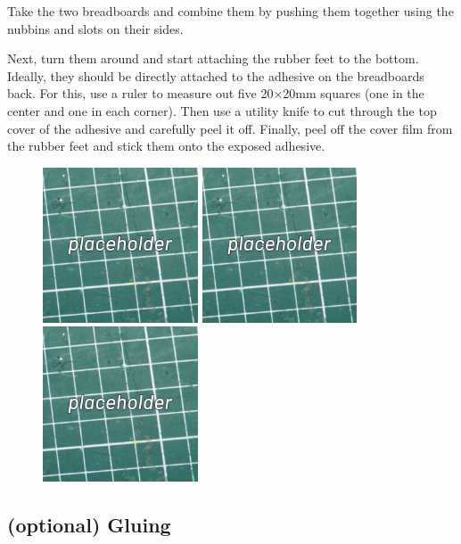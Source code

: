 \documentclass[12pt, a4paper]{article}
\begin{document}
Take the two breadboards and combine them by pushing them together using the nubbins and slots
on their sides.

Next, turn them around and start attaching the rubber feet to the bottom. Ideally, they should
be directly attached to the adhesive on the breadboards back. For this, use a
ruler to measure out five 20×20mm squares (one in the center and one in each corner).
Then use a utility knife to cut through the top cover of the adhesive and carefully peel it
off. Finally, peel off the cover film from the rubber feet and stick them onto the exposed
adhesive.

\begin{figure}[H]
    \centering
    \includegraphics[width=46mm]{images/placeholder.jpg}
    \hspace{2mm}
    \includegraphics[width=46mm]{images/placeholder.jpg}
    \hspace{2mm}
    \includegraphics[width=46mm]{images/placeholder.jpg}
\end{figure}

\subsection{\small (optional) \normalsize Gluing}
\label{ssec:gluing}
\end{document}

